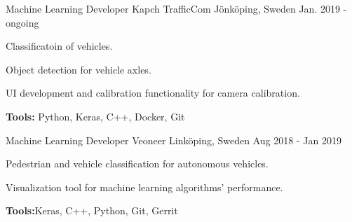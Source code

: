 

\begin{cventries}

  \cventry
    {Machine Learning Developer} %
    {Kapch TrafficCom} %
    {Jönköping, Sweden} %
    {Jan. 2019 - ongoing} %
    {
      \begin{cvitems} %
        \item {Classificatoin of vehicles.}
        \item {Object detection for vehicle axles.}
        \item {UI development and calibration functionality for camera calibration.}
        \item {\textbf{Tools:} Python, Keras, C++, Docker, Git}
      \end{cvitems}
    }

  \cventry
    {Machine Learning Developer} %
    {Veoneer} %
    {Linköping, Sweden} %
    {Aug 2018 - Jan 2019} %
    {
      \begin{cvitems} %
        \item {Pedestrian and vehicle classification for autonomous vehicles.}
        \item {Visualization tool for machine learning algorithms' performance.}
        \item {\textbf{Tools:}Keras, C++, Python, Git, Gerrit}
      \end{cvitems}
    }


\end{cventries}
